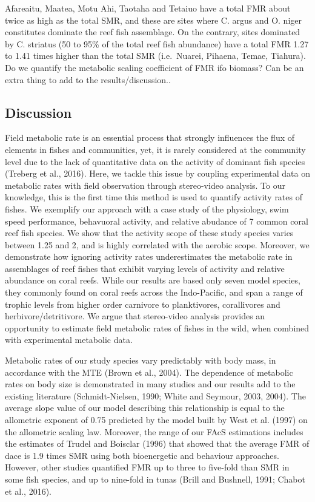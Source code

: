 \documentclass[12pt,a4paper]{article}
\begin{document}
\noindent  Afareaitu, Maatea, Motu Ahi, Taotaha and Tetaiuo have a total
FMR about twice as high as the total SMR, and these are sites where C.
argus and O. niger constitutes dominate the reef fish assemblage. On the
contrary, sites dominated by C. striatus (50 to 95\% of the total reef
fish abundance) have a total FMR 1.27 to 1.41 times higher than the
total SMR (i.e.~Nuarei, Pihaena, Temae, Tiahura). Do we quantify the
metabolic scaling coefficient of FMR ifo biomass? Can be an extra thing
to add to the results/discussion..

\hypertarget{discussion}{%
\subsection{Discussion}\label{discussion}}

\noindent Field metabolic rate is an essential process that strongly
influences the flux of elements in fishes and communities, yet, it is
rarely considered at the community level due to the lack of quantitative
data on the activity of dominant fish species (Treberg et al., 2016).
Here, we tackle this issue by coupling experimental data on metabolic
rates with field observation through stereo-video analysis. To our
knowledge, this is the first time this method is used to quantify
activity rates of fishes. We exemplify our approach with a case study of
the physiology, swim speed performance, behavuoral activity, and
relative abudance of 7 common coral reef fish species. We show that the
activity scope of these study species varies between 1.25 and 2, and is
highly correlated with the aerobic scope. Moreover, we demonstrate how
ignoring activity rates underestimates the metabolic rate in assemblages
of reef fishes that exhibit varying levels of activity and relative
abundance on coral reefs. While our results are based only seven model
species, they commonly found on coral reefs across the Indo-Pacific, and
span a range of trophic levels from higher order carnivore to
planktivores, corallivores and herbivore/detritivore. We argue that
stereo-video analysis provides an opportunity to estimate field
metabolic rates of fishes in the wild, when combined with experimental
metabolic data.

\noindent Metabolic rates of our study species vary predictably with
body mass, in accordance with the MTE (Brown et al., 2004). The
dependence of metabolic rates on body size is demonstrated in many
studies and our results add to the existing literature (Schmidt-Nielsen,
1990; White and Seymour, 2003, 2004). The average slope value of our
model describing this relationship is equal to the allometric exponent
of 0.75 predicted by the model built by West et al. (1997) on the
allometric scaling law. Moreover, the range of our FAcS estimations
includes the estimates of Trudel and Boisclar (1996) that showed that
the average FMR of dace is 1.9 times SMR using both bioenergetic and
behaviour approaches. However, other studies quantified FMR up to three
to five-fold than SMR in some fish species, and up to nine-fold in tunas
(Brill and Bushnell, 1991; Chabot et al., 2016).
\end{document}
